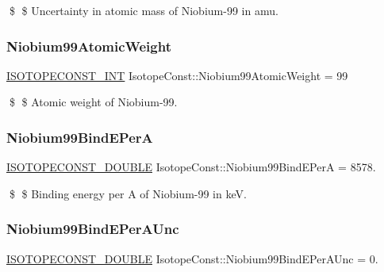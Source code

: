 \$ \$ Uncertainty in atomic mass of Niobium-\/99 in amu. \mbox{\label{group___isotope_const-_niobium-_nb99_gaa39eb70dfc37f29d15f62086118df005}} 
\subsubsection{\texorpdfstring{Niobium99\+Atomic\+Weight}{Niobium99AtomicWeight}}
{\footnotesize\ttfamily \mbox{\hyperlink{group___isotope_const-_macros_ga5f18360b3e99483a35c32d789e62621c}{I\+S\+O\+T\+O\+P\+E\+C\+O\+N\+S\+T\+\_\+\+I\+NT}} Isotope\+Const\+::\+Niobium99\+Atomic\+Weight = 99}

\$ \$ Atomic weight of Niobium-\/99. \mbox{\label{group___isotope_const-_niobium-_nb99_ga231a90f42293fdd9e040c68ee6df9fbb}} 
\subsubsection{\texorpdfstring{Niobium99\+Bind\+E\+PerA}{Niobium99BindEPerA}}
{\footnotesize\ttfamily \mbox{\hyperlink{group___isotope_const-_macros_ga8f45a7272ce02c0b4c65c44636ed719a}{I\+S\+O\+T\+O\+P\+E\+C\+O\+N\+S\+T\+\_\+\+D\+O\+U\+B\+LE}} Isotope\+Const\+::\+Niobium99\+Bind\+E\+PerA = 8578.}

\$ \$ Binding energy per A of Niobium-\/99 in keV. \mbox{\label{group___isotope_const-_niobium-_nb99_ga81928e367da4503c685fa8716e4e5669}} 
\subsubsection{\texorpdfstring{Niobium99\+Bind\+E\+Per\+A\+Unc}{Niobium99BindEPerAUnc}}
{\footnotesize\ttfamily \mbox{\hyperlink{group___isotope_const-_macros_ga8f45a7272ce02c0b4c65c44636ed719a}{I\+S\+O\+T\+O\+P\+E\+C\+O\+N\+S\+T\+\_\+\+D\+O\+U\+B\+LE}} Isotope\+Const\+::\+Niobium99\+Bind\+E\+Per\+A\+Unc = 0.}


